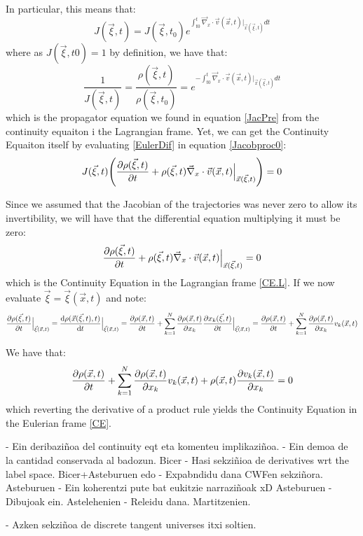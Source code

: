 \documentclass[11pt, a4paper]{article} %
\DeclareRobustCommand{\mybox}[2][gray!20]{%
\begin{tcolorbox}[   %
        left=1cm,
        right=1cm,
        top=0.5cm,
        bottom=0.5cm,
        colback=#1,
        colframe=#1,
        width=\dimexpr\textwidth\relax, 
        enlarge left by=0mm,
        boxsep=5pt,
        arc=0pt,outer arc=0pt,
        ]
        #2
\end{tcolorbox}
}
\begin{document}
\mybox{
In particular, this means that:
\begin{equation}
J(\vec{\xi},t)=J(\vec{\xi},t_0)e^{\int_{t0}^t \vec{\nabla}_x\cdot\vec{v}(\vec{x},t)\Big\rvert_{\vec{x}(\vec{\xi},t)}dt}
\end{equation}
where as $J(\vec{\xi},t0)=1$ by definition, we have that:
\begin{equation}
\frac{1}{J(\vec{\xi},t)}=\frac{\rho(\vec{\xi},t)}{\rho(\vec{\xi},t_0)}=e^{-\int_{t0}^t \vec{\nabla}_x\cdot\vec{v}(\vec{x},t)\Big\rvert_{\vec{x}(\vec{\xi},t)}dt}
\end{equation}
which is the propagator equation we found in equation \eqref{JacPre} from the continuity equaiton i the Lagrangian frame. Yet, we can get the Continuity Equaiton itself by evaluating \eqref{EulerDif} in equation \eqref{Jacobproc0}:
\begin{equation}
J(\vec{\xi},t)\qty(\pdv{\rho(\vec{\xi},t)}{t}+\rho(\vec{\xi},t)\vec{\nabla}_x\cdot\vec{v}(\vec{x},t)\Big\rvert_{\vec{x}(\vec{\xi},t)})=0
\end{equation}

Since we assumed that the Jacobian of the trajectories was never zero to allow its invertibility, we will have that the differential equation multiplying it must be zero:
\begin{equation}
\pdv{\rho(\vec{\xi},t)}{t}+\rho(\vec{\xi},t)\vec{\nabla}_x\cdot\vec{v}(\vec{x},t)\Big\rvert_{\vec{x}(\vec{\xi},t)}=0
\end{equation}
which is the Continuity Equation in the Lagrangian frame \eqref{CE.L}. If we now evaluate $\vec{\xi}=\vec{\xi}(\vec{x},t)$ and note:
\begin{equation}
\pdv{\rho(\vec{\xi},t)}{t}\Big\rvert_{\vec{\xi}(\vec{x},t)}=\dv{\rho(\vec{x}(\vec{\xi},t),t)}{t}\Big\rvert_{\vec{\xi}(\vec{x},t)}=\pdv{\rho(\vec{x},t)}{t}+\sum_{k=1}^N\pdv{\rho(\vec{x},t)}{x_k}\pdv{x_k(\vec{\xi},t)}{t}\Big\rvert_{\vec{\xi}(\vec{x},t)}=\pdv{\rho(\vec{x},t)}{t}+\sum_{k=1}^N\pdv{\rho(\vec{x},t)}{x_k}v_k(\vec{x},t)
\end{equation}

We have that:
\begin{equation}
\pdv{\rho(\vec{x},t)}{t}+\sum_{k=1}^N\pdv{\rho(\vec{x},t)}{x_k}v_k(\vec{x},t)+\rho(\vec{x},t)\pdv{v_k(\vec{x},t)}{x_k}=0
\end{equation}
which reverting the derivative of a product rule yields the Continuity Equation in the Eulerian frame \eqref{CE}.


}
\mybox{


- Ein deribaziñoa del continuity eqt eta komenteu implikaziñoa. 
- Ein demoa de la cantidad conservada al badozun. Bicer
- Hasi sekziñioa de derivatives wrt the label space. Bicer+Asteburuen edo
- Expabndidu dana CWFen sekziñora. Asteburuen
- Ein koherentzi pute bat eukitzie narraziñoak xD Asteburuen
- Dibujoak ein. Astelehenien
- Releidu dana. Martitzenien.

- Azken sekziñoa de discrete tangent universes itxi soltien.
}
\end{document}
